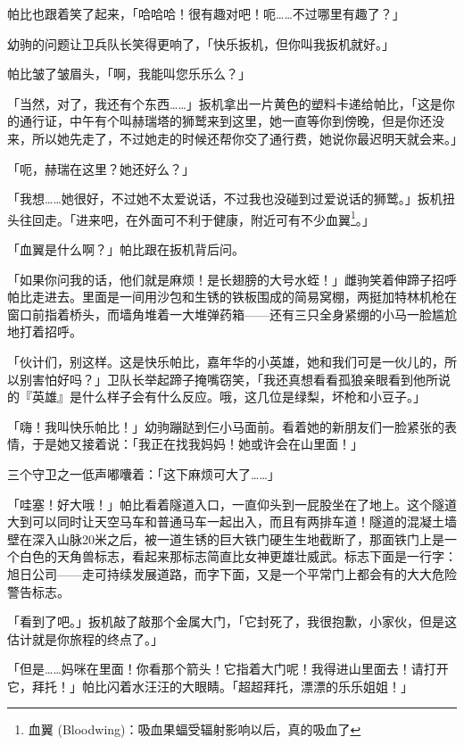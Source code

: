 帕比也跟着笑了起来，「哈哈哈！很有趣对吧！呃……不过哪里有趣了？」

幼驹的问题让卫兵队长笑得更响了，「快乐扳机，但你叫我扳机就好。」

帕比皱了皱眉头，「啊，我能叫您乐乐么？」

「当然，对了，我还有个东西……」扳机拿出一片黄色的塑料卡递给帕比，「这是你的通行证，中午有个叫赫瑞塔的狮鹫来到这里，她一直等你到傍晚，但是你还没来，所以她先走了，不过她走的时候还帮你交了通行费，她说你最迟明天就会来。」

「呃，赫瑞在这里？她还好么？」

「我想……她很好，不过她不太爱说话，不过我也没碰到过爱说话的狮鹫。」扳机扭头往回走。「进来吧，在外面可不利于健康，附近可有不少血翼\footnote{血翼 (Bloodwing)：吸血果蝠受辐射影响以后，真的吸血了}。」

「血翼是什么啊？」帕比跟在扳机背后问。

「如果你问我的话，他们就是麻烦！是长翅膀的大号水蛭！」雌驹笑着伸蹄子招呼帕比走进去。里面是一间用沙包和生锈的铁板围成的简易窝棚，两挺加特林机枪在窗口前指着桥头，而墙角堆着一大堆弹药箱——还有三只全身紧绷的小马一脸尴尬地打着招呼。

「伙计们，别这样。这是快乐帕比，嘉年华的小英雄，她和我们可是一伙儿的，所以别害怕好吗？」卫队长举起蹄子掩嘴窃笑，「我还真想看看孤狼亲眼看到他所说的『英雄』是什么样子会有什么反应。哦，这几位是绿梨，坏枪和小豆子。」

「嗨！我叫快乐帕比！」幼驹蹦跶到仨小马面前。看着她的新朋友们一脸紧张的表情，于是她又接着说：「我正在找我妈妈！她或许会在山里面！」

三个守卫之一低声嘟囔着：「这下麻烦可大了……」

\horizonline


「哇塞！好大哦！」帕比看着隧道入口，一直仰头到一屁股坐在了地上。这个隧道大到可以同时让天空马车和普通马车一起出入，而且有两排车道！隧道的混凝土墙壁在深入山脉20米之后，被一道生锈的巨大铁门硬生生地截断了，那面铁门上是一个白色的天角兽标志，看起来那标志简直比女神更雄壮威武。标志下面是一行字：旭日公司——走可持续发展道路，而字下面，又是一个平常门上都会有的大大危险警告标志。

「看到了吧。」扳机敲了敲那个金属大门，「它封死了，我很抱歉，小家伙，但是这估计就是你旅程的终点了。」

「但是……妈咪在里面！你看那个箭头！它指着大门呢！我得进山里面去！请打开它，拜托！」帕比闪着水汪汪的大眼睛。「超超拜托，漂漂的乐乐姐姐！」

